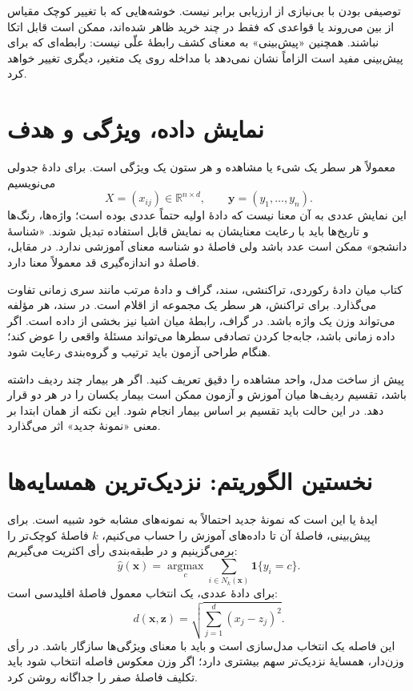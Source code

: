 توصیفی بودن با بی‌نیازی از ارزیابی برابر نیست. خوشه‌هایی که با تغییر کوچک مقیاس از بین می‌روند یا قواعدی که فقط در چند خرید ظاهر شده‌اند، ممکن است قابل اتکا نباشند. همچنین «پیش‌بینی» به معنای کشف رابطهٔ علّی نیست: رابطه‌ای که برای پیش‌بینی مفید است الزاماً نشان نمی‌دهد با مداخله روی یک متغیر، دیگری تغییر خواهد کرد.

\section{نمایش داده، ویژگی و هدف}
معمولاً هر سطر یک شیء یا مشاهده و هر ستون یک ویژگی  است. برای دادهٔ جدولی می‌نویسیم
\[X=(x_{ij})\in\mathbb R^{n\times d},\qquad \mathbf y=(y_1,\ldots,y_n).\]
این نمایش عددی به آن معنا نیست که دادهٔ اولیه حتماً عددی بوده است؛ واژه‌ها، رنگ‌ها و تاریخ‌ها باید با رعایت معنایشان به نمایش قابل استفاده تبدیل شوند. «شناسهٔ دانشجو» ممکن است عدد باشد ولی فاصلهٔ دو شناسه معنای آموزشی ندارد. در مقابل، فاصلهٔ دو اندازه‌گیری قد معمولاً معنا دارد.

کتاب میان دادهٔ رکوردی، تراکنشی، سند، گراف و دادهٔ مرتب مانند سری زمانی تفاوت می‌گذارد. برای تراکنش، هر سطر یک مجموعه از اقلام است. در سند، هر مؤلفه می‌تواند وزن یک واژه باشد. در گراف، رابطهٔ میان اشیا نیز بخشی از داده است. اگر داده زمانی باشد، جابه‌جا کردن تصادفی سطرها می‌تواند مسئلهٔ واقعی را عوض کند؛ هنگام طراحی آزمون باید ترتیب و گروه‌بندی رعایت شود.

پیش از ساخت مدل، واحد مشاهده را دقیق تعریف کنید. اگر هر بیمار چند ردیف داشته باشد، تقسیم ردیف‌ها میان آموزش و آزمون ممکن است بیمار یکسان را در هر دو قرار دهد. در این حالت باید تقسیم بر اساس بیمار انجام شود. این نکته از همان ابتدا بر معنی «نمونهٔ جدید» اثر می‌گذارد.

\section{نخستین الگوریتم: نزدیک‌ترین همسایه‌ها}
ایدهٔ  یا  این است که نمونهٔ جدید احتمالاً به نمونه‌های مشابه خود شبیه است. برای پیش‌بینی، فاصلهٔ آن تا داده‌های آموزش را حساب می‌کنیم، $k$ فاصلهٔ کوچک‌تر را برمی‌گزینیم و در طبقه‌بندی رأی اکثریت می‌گیریم:
\[\widehat y(\mathbf x)=\underset{c}{\operatorname{argmax}}\sum_{i\in N_k(\mathbf x)}\mathbf1\{y_i=c\}.\]
برای دادهٔ عددی، یک انتخاب معمول فاصلهٔ اقلیدسی است:
\[d(\mathbf x,\mathbf z)=\sqrt{\sum_{j=1}^d(x_j-z_j)^2}.\]
این فاصله یک انتخاب مدل‌سازی است و باید با معنای ویژگی‌ها سازگار باشد. در رأی وزن‌دار، همسایهٔ نزدیک‌تر سهم بیشتری دارد؛ اگر وزن معکوس فاصله انتخاب شود باید تکلیف فاصلهٔ صفر را جداگانه روشن کرد.

